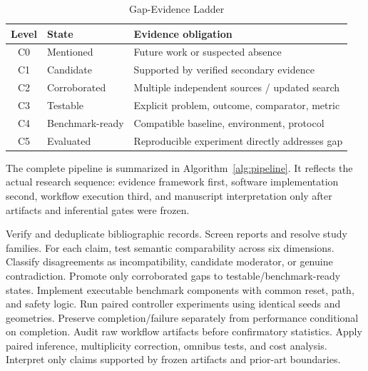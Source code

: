 \begin{table}[H]
\caption{Gap-Evidence Ladder}
\label{tab:gapladder}
\centering
\scriptsize
\begin{tabular}{clp{}}
\toprule
Level & State & Evidence obligation\\
\midrule
C0 & Mentioned & Future work or suspected absence\\
C1 & Candidate & Supported by verified secondary evidence\\
C2 & Corroborated & Multiple independent sources / updated search\\
C3 & Testable & Explicit problem, outcome, comparator, metric\\
C4 & Benchmark-ready & Compatible baseline, environment, protocol\\
C5 & Evaluated & Reproducible experiment directly addresses gap\\
\bottomrule
\end{tabular}
\end{table}

The complete pipeline is summarized in Algorithm~\ref{alg:pipeline}. It reflects the actual research sequence: evidence framework first, software implementation second, workflow execution third, and manuscript interpretation only after artifacts and inferential gates were frozen.

\begin{algorithm}[H]
\caption{Evidence-to-Benchmark Research Pipeline}
\label{alg:pipeline}
\begin{algorithmic}[1]
\State Verify and deduplicate bibliographic records.
\State Screen reports and resolve study families.
\State For each claim, test semantic comparability across six dimensions.
\State Classify disagreements as incompatibility, candidate moderator, or genuine contradiction.
\State Promote only corroborated gaps to testable/benchmark-ready states.
\State Implement executable benchmark components with common reset, path, and safety logic.
\State Run paired controller experiments using identical seeds and geometries.
\State Preserve completion/failure separately from performance conditional on completion.
\State Audit raw workflow artifacts before confirmatory statistics.
\State Apply paired inference, multiplicity correction, omnibus tests, and cost analysis.
\State Interpret only claims supported by frozen artifacts and prior-art boundaries.
\end{algorithmic}
\end{algorithm}
